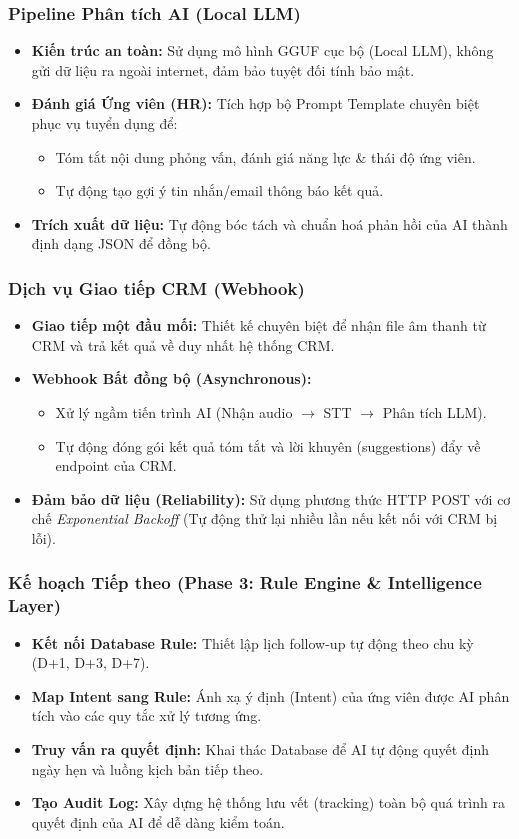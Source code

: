 \documentclass{beamer}
\begin{document}
\begin{frame}
\frametitle{Pipeline Phân tích AI (Local LLM)}
\begin{itemize}
    \item \textbf{Kiến trúc an toàn:} Sử dụng mô hình GGUF cục bộ (Local LLM), không gửi dữ liệu ra ngoài internet, đảm bảo tuyệt đối tính bảo mật.
    \item \textbf{Đánh giá Ứng viên (HR):} Tích hợp bộ Prompt Template chuyên biệt phục vụ tuyển dụng để:
    \begin{itemize}
        \item Tóm tắt nội dung phỏng vấn, đánh giá năng lực \& thái độ ứng viên.
        \item Tự động tạo gợi ý tin nhắn/email thông báo kết quả.
    \end{itemize}
    \item \textbf{Trích xuất dữ liệu:} Tự động bóc tách và chuẩn hoá phản hồi của AI thành định dạng JSON để đồng bộ.
\end{itemize}
\end{frame}

\begin{frame}
\frametitle{Dịch vụ Giao tiếp CRM (Webhook)}
\begin{itemize}
    \item \textbf{Giao tiếp một đầu mối:} Thiết kế chuyên biệt để nhận file âm thanh từ CRM và trả kết quả về duy nhất hệ thống CRM.
    \item \textbf{Webhook Bất đồng bộ (Asynchronous):}
    \begin{itemize}
        \item Xử lý ngầm tiến trình AI (Nhận audio $\rightarrow$ STT $\rightarrow$ Phân tích LLM).
        \item Tự động đóng gói kết quả tóm tắt và lời khuyên (suggestions) đẩy về endpoint của CRM.
    \end{itemize}
    \item \textbf{Đảm bảo dữ liệu (Reliability):} Sử dụng phương thức HTTP POST với cơ chế \textit{Exponential Backoff} (Tự động thử lại nhiều lần nếu kết nối với CRM bị lỗi).
\end{itemize}
\end{frame}

\begin{frame}
\frametitle{Kế hoạch Tiếp theo (Phase 3: Rule Engine \& Intelligence Layer)}
\begin{itemize}
    \item \textbf{Kết nối Database Rule:} Thiết lập lịch follow-up tự động theo chu kỳ (D+1, D+3, D+7).
    \item \textbf{Map Intent sang Rule:} Ánh xạ ý định (Intent) của ứng viên được AI phân tích vào các quy tắc xử lý tương ứng.
    \item \textbf{Truy vấn ra quyết định:} Khai thác Database để AI tự động quyết định ngày hẹn và luồng kịch bản tiếp theo.
    \item \textbf{Tạo Audit Log:} Xây dựng hệ thống lưu vết (tracking) toàn bộ quá trình ra quyết định của AI để dễ dàng kiểm toán.
\end{itemize}
\end{frame}
\end{document}
